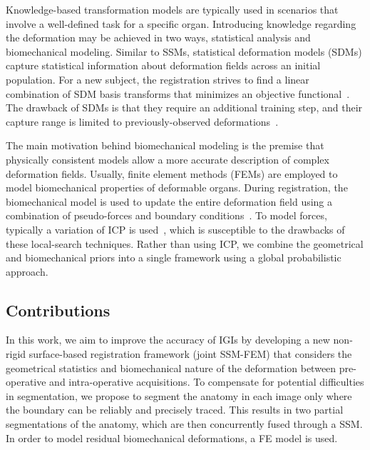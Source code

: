 \documentclass[journal]{IEEEtran}
\begin{document}
Knowledge-based transformation models are typically used in scenarios that involve a well-defined task for a specific organ. Introducing knowledge regarding the deformation may be achieved in two ways, statistical analysis and biomechanical modeling. Similar to SSMs, statistical deformation models (SDMs) capture statistical
information about deformation fields across an initial population. For a new subject, the registration strives to find a linear combination of SDM basis transforms that minimizes an objective functional~\cite{Hu12a,Ashraf02a}. The drawback of SDMs is that they require an additional training step, and their capture range is limited to previously-observed deformations~\cite{Hu12a}.

The main motivation behind biomechanical modeling is the premise that physically consistent models allow a more accurate description of complex deformation fields.
Usually, finite element methods (FEMs) are employed to model biomechanical properties of deformable organs. During registration, the biomechanical model is used to update the entire deformation field using a combination of pseudo-forces and boundary conditions~\cite{Cash05a,Ferrant01a,Moradi12a,Noe10a,Rucker14a}. To model forces, typically a variation of ICP is used~\cite{Ferrant01a,Moradi12a,Rucker14a}, which is susceptible to the drawbacks of these local-search techniques. Rather than using ICP, we combine the geometrical and biomechanical priors into a single framework using a global probabilistic approach.
\subsection{Contributions}
In this work, we aim to improve the accuracy of IGIs by developing a new non-rigid surface-based registration framework (joint SSM-FEM) that considers the geometrical statistics and biomechanical nature of the deformation between pre-operative and intra-operative acquisitions. To compensate for potential difficulties in segmentation, we propose to segment the anatomy in each image only where the boundary can be reliably and precisely traced. This results in two partial segmentations of the anatomy, which are then concurrently fused through a SSM. In order to model residual biomechanical deformations, a FE model is used.
\end{document}
